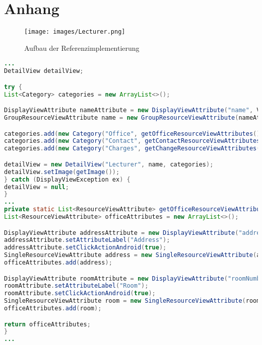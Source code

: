 \chapter{Anhang}

\newpage
\begin{figure}[H]
	\begin{center}
		\texttt{[image: images/Lecturer.png]}
		\caption{Aufbau der Referenzimplementierung}
		\label{fig:lecturer}
	\end{center}
\end{figure}

\newpage

\begin{lstlisting}[label=lst:detailview_impl,
language=java,
firstnumber=1,
caption=Erstellung einer DetailView.]				   
...
DetailView detailView;

try {
List<Category> categories = new ArrayList<>();

DisplayViewAttribute nameAttribute = new DisplayViewAttribute("name", ViewAttribute.AttributeType.TEXT);
GroupResourceViewAttribute name = new GroupResourceViewAttribute(nameAttribute, getViewTitleAttributes());

categories.add(new Category("Office", getOfficeResourceViewAttributes()));
categories.add(new Category("Contact", getContactResourceViewAttributes()));
categories.add(new Category("Charges", getChangeResourceViewAttributes()));

detailView = new DetailView("Lecturer", name, categories);
detailView.setImage(getImage());
} catch (DisplayViewException ex) {
detailView = null;
}
...
private static List<ResourceViewAttribute> getOfficeResourceViewAttributes() {
List<ResourceViewAttribute> officeAttributes = new ArrayList<>();

DisplayViewAttribute addressAttribute = new DisplayViewAttribute("address", ViewAttribute.AttributeType.LOCATION);
addressAttribute.setAttributeLabel("Address");
addressAttribute.setClickActionAndroid(true);
SingleResourceViewAttribute address = new SingleResourceViewAttribute(addressAttribute);
officeAttributes.add(address);

DisplayViewAttribute roomAttribute = new DisplayViewAttribute("roomNumber", ViewAttribute.AttributeType.TEXT);
roomAttribute.setAttributeLabel("Room");
roomAttribute.setClickActionAndroid(true);
SingleResourceViewAttribute room = new SingleResourceViewAttribute(roomAttribute);
officeAttributes.add(room);

return officeAttributes;
}
...
\end{lstlisting}

